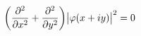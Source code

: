 $$
\biggl ({\partial^2 \over \partial x^2} + {\partial^2 \over \partial y^2} \biggr )
\bigl | \varphi(x + i y) \bigr |^2 = 0
$$


\bye


